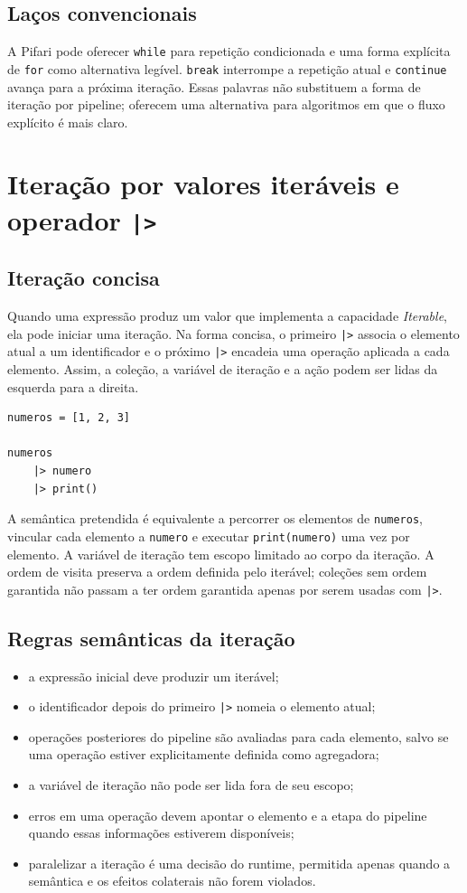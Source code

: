 \documentclass[12pt,a4paper]{article}
\begin{document}
\subsection{Laços convencionais}
A Pifari pode oferecer \texttt{while} para repetição condicionada e uma forma explícita de \texttt{for} como alternativa legível. \texttt{break} interrompe a repetição atual e \texttt{continue} avança para a próxima iteração. Essas palavras não substituem a forma de iteração por pipeline; oferecem uma alternativa para algoritmos em que o fluxo explícito é mais claro.

\section{Iteração por valores iteráveis e operador \texttt{|>}}
\subsection{Iteração concisa}
Quando uma expressão produz um valor que implementa a capacidade \textit{Iterable}, ela pode iniciar uma iteração. Na forma concisa, o primeiro \texttt{|>} associa o elemento atual a um identificador e o próximo \texttt{|>} encadeia uma operação aplicada a cada elemento. Assim, a coleção, a variável de iteração e a ação podem ser lidas da esquerda para a direita.

\begin{lstlisting}
numeros = [1, 2, 3]

numeros
    |> numero
    |> print()
\end{lstlisting}

A semântica pretendida é equivalente a percorrer os elementos de \texttt{numeros}, vincular cada elemento a \texttt{numero} e executar \texttt{print(numero)} uma vez por elemento. A variável de iteração tem escopo limitado ao corpo da iteração. A ordem de visita preserva a ordem definida pelo iterável; coleções sem ordem garantida não passam a ter ordem garantida apenas por serem usadas com \texttt{|>}.

\subsection{Regras semânticas da iteração}
\begin{itemize}
\item a expressão inicial deve produzir um iterável;
\item o identificador depois do primeiro \texttt{|>} nomeia o elemento atual;
\item operações posteriores do pipeline são avaliadas para cada elemento, salvo se uma operação estiver explicitamente definida como agregadora;
\item a variável de iteração não pode ser lida fora de seu escopo;
\item erros em uma operação devem apontar o elemento e a etapa do pipeline quando essas informações estiverem disponíveis;
\item paralelizar a iteração é uma decisão do runtime, permitida apenas quando a semântica e os efeitos colaterais não forem violados.
\end{itemize}
\end{document}
